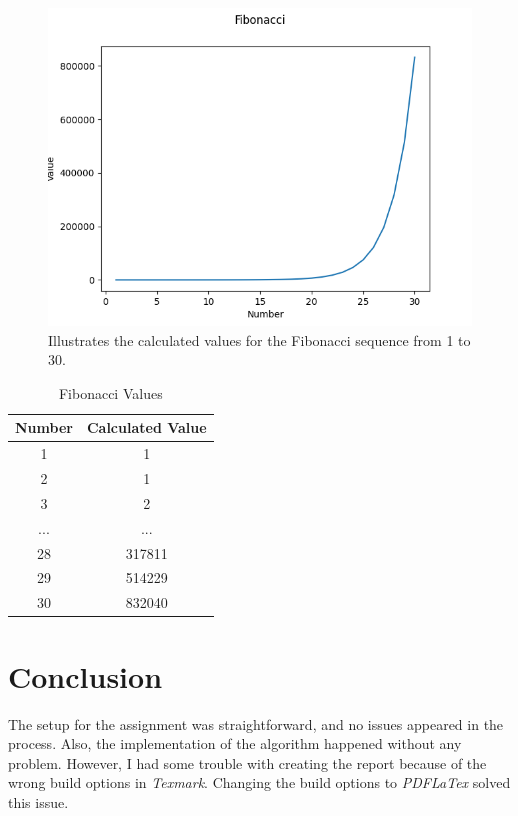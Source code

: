 \documentclass[10pt, a4paper, twocolumn]{article} %
\begin{document}
\begin{figure}[t] %
  \centering
  \includegraphics[width=\columnwidth]{pics/fibonacci_1.png}
  \caption{Illustrates the calculated values for the Fibonacci sequence from 1 to 30.}
  \label{fig:fibonacciPlot}
\end{figure}

\begin{table}[h]
         \label{tab:fibonacciValuesTable}
	\caption{Fibonacci Values}
	\centering
	\begin{tabular}{c c}
		\toprule
		Number & Calculated Value \\
		\midrule
		1 & 1 \\
		2 & 1 \\
		3 & 2 \\
		... & ... \\
		28 & 317811 \\
		29 & 514229 \\
		30 & 832040 \\
		\bottomrule
	\end{tabular}
\end{table}


\section{Conclusion}
The setup for the assignment was straightforward, and no issues appeared in the process. Also, the implementation of the algorithm happened without any problem. However, I had some trouble with creating the report because of the wrong build options in \textit{Texmark}. Changing the build options to \textit{PDFLaTex} solved this issue. 
\end{document}
